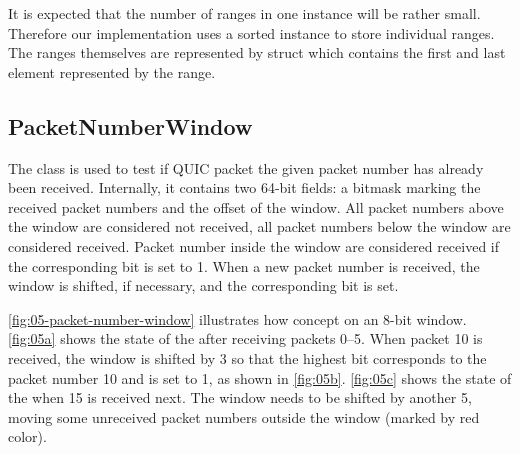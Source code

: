 It is expected that the number of ranges in one \RangeSet{} instance will be rather small. Therefore
our implementation uses a sorted  instance to store individual ranges. The ranges
themselves are represented by  struct which contains the first and last
element represented by the range.

\subsection{PacketNumberWindow}

The \PacketNumberWindow{} class is used to test if QUIC packet the given packet number has already
been received. Internally, it contains two 64-bit  fields: a bitmask marking the
received packet numbers and the offset of the window. All packet numbers above the window are
considered not received, all packet numbers below the window are considered received. Packet number
inside the window are considered received if the corresponding bit is set to 1. When a new packet
number is received, the window is shifted, if necessary, and the corresponding bit is set.


\autoref{fig:05-packet-number-window} illustrates how concept on an 8-bit window. \autoref{fig:05a}
shows the state of the \PacketNumberWindow{} after receiving packets 0--5. When packet 10 is
received, the window is shifted by 3 so that the highest bit corresponds to the packet number 10 and
is set to 1, as shown in \autoref{fig:05b}. \autoref{fig:05c} shows the state of the
\PacketNumberWindow{} when 15 is received next. The window needs to be shifted by another 5, moving
some unreceived packet numbers outside the window (marked by red color).

